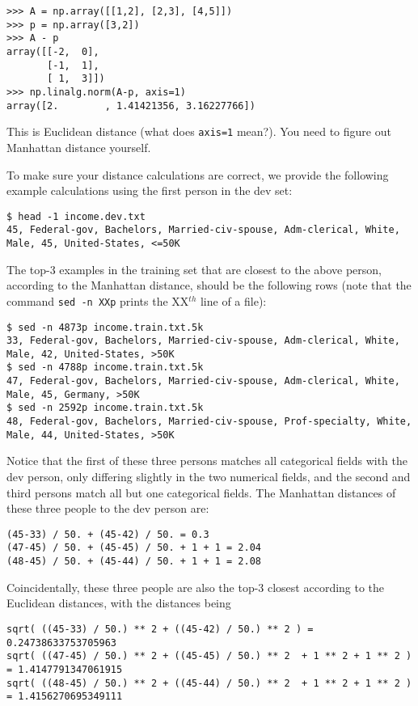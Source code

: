 \documentclass[11pt]{article}
\begin{document}
\begin{verbatim}
>>> A = np.array([[1,2], [2,3], [4,5]])
>>> p = np.array([3,2])
>>> A - p
array([[-2,  0],
       [-1,  1],
       [ 1,  3]])
>>> np.linalg.norm(A-p, axis=1)
array([2.        , 1.41421356, 3.16227766])
\end{verbatim}

This is Euclidean distance (what does \verb|axis=1| mean?). You need to figure out Manhattan distance yourself.

To make sure your distance calculations are correct, we provide the following example calculations using the first person in the dev set:

\begin{verbatim}
$ head -1 income.dev.txt
45, Federal-gov, Bachelors, Married-civ-spouse, Adm-clerical, White, Male, 45, United-States, <=50K
\end{verbatim}

The top-3  examples in the training set that are closest to the above person, according to the Manhattan distance, should be the following rows
(note that the command \verb|sed -n XXp| prints the XX$^{th}$ line of a file):

\begin{verbatim}
$ sed -n 4873p income.train.txt.5k
33, Federal-gov, Bachelors, Married-civ-spouse, Adm-clerical, White, Male, 42, United-States, >50K
$ sed -n 4788p income.train.txt.5k
47, Federal-gov, Bachelors, Married-civ-spouse, Adm-clerical, White, Male, 45, Germany, >50K
$ sed -n 2592p income.train.txt.5k
48, Federal-gov, Bachelors, Married-civ-spouse, Prof-specialty, White, Male, 44, United-States, >50K
\end{verbatim}

Notice that the first of these three persons matches all categorical fields with the dev person, only differing slightly in the two numerical fields, 
and the second and third persons match all but one categorical fields.
The Manhattan distances of these three people to the dev person are:

\begin{verbatim}
(45-33) / 50. + (45-42) / 50. = 0.3
(47-45) / 50. + (45-45) / 50. + 1 + 1 = 2.04
(48-45) / 50. + (45-44) / 50. + 1 + 1 = 2.08
\end{verbatim}

Coincidentally, these three people are also the top-3 closest according to the Euclidean distances, with the distances being

\begin{verbatim}
sqrt( ((45-33) / 50.) ** 2 + ((45-42) / 50.) ** 2 ) = 0.24738633753705963
sqrt( ((47-45) / 50.) ** 2 + ((45-45) / 50.) ** 2  + 1 ** 2 + 1 ** 2 ) = 1.4147791347061915
sqrt( ((48-45) / 50.) ** 2 + ((45-44) / 50.) ** 2  + 1 ** 2 + 1 ** 2 ) = 1.4156270695349111
\end{verbatim}
\end{document}
